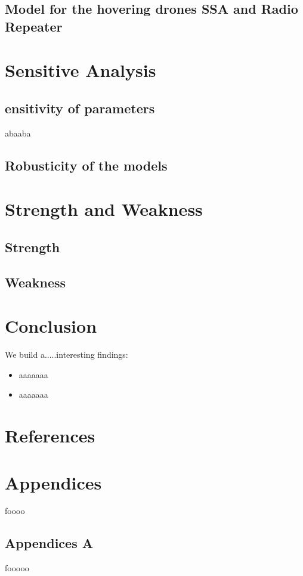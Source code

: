 \documentclass[13pt]{ctexart} %
\begin{document}
\subsection{Model for the hovering drones SSA and Radio Repeater}


\section{Sensitive Analysis}
\subsection{ensitivity of parameters}
abaaba
\subsection{Robusticity of the models}

\section{Strength and Weakness}
\subsection{Strength}


\subsection{Weakness}


\section{Conclusion}
We build a.....interesting findings:

\begin{itemize}
    \item aaaaaaa
    \item aaaaaaa
\end{itemize}

\newpage
\section*{References}
\fancyhf{}
\fancyhead[R]{ }
\fancyhead[L]{ }

\Large

\newpage

\section*{Appendices}
\fontsize{13pt}{12.5pt}\selectfont
foooo
\vspace{7pt}
\subsection*{Appendices A}
fooooo
\end{document}
